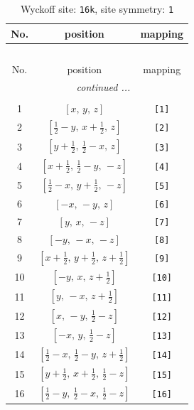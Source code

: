 \documentclass[fleqn,8pt]{jsarticle}
\begin{document}
\begin{longtable}{ccc}
\caption{Wyckoff site: {\tt 16k}, site symmetry: {\tt 1}}
 \\
 \hline \hline
No. & position & mapping \\ \hline \endfirsthead

\multicolumn{2}{l}{\tablename\ \thetable{}} \\
 \hline \hline
No. & position & mapping \\ \hline \endhead

 \hline \hline
\multicolumn{2}{r}{\footnotesize\it continued ...} \\ \endfoot

 \hline \hline
\multicolumn{2}{r}{} \\ \endlastfoot

1 & $\left[ x,\, y,\, z \right]$ & {\tt [1]} \\ \hline
2 & $\left[ \frac{1}{2} - y,\, x + \frac{1}{2},\, z \right]$ & {\tt [2]} \\ \hline
3 & $\left[ y + \frac{1}{2},\, \frac{1}{2} - x,\, z \right]$ & {\tt [3]} \\ \hline
4 & $\left[ x + \frac{1}{2},\, \frac{1}{2} - y,\, - z \right]$ & {\tt [4]} \\ \hline
5 & $\left[ \frac{1}{2} - x,\, y + \frac{1}{2},\, - z \right]$ & {\tt [5]} \\ \hline
6 & $\left[ - x,\, - y,\, z \right]$ & {\tt [6]} \\ \hline
7 & $\left[ y,\, x,\, - z \right]$ & {\tt [7]} \\ \hline
8 & $\left[ - y,\, - x,\, - z \right]$ & {\tt [8]} \\ \hline
9 & $\left[ x + \frac{1}{2},\, y + \frac{1}{2},\, z + \frac{1}{2} \right]$ & {\tt [9]} \\ \hline
10 & $\left[ - y,\, x,\, z + \frac{1}{2} \right]$ & {\tt [10]} \\ \hline
11 & $\left[ y,\, - x,\, z + \frac{1}{2} \right]$ & {\tt [11]} \\ \hline
12 & $\left[ x,\, - y,\, \frac{1}{2} - z \right]$ & {\tt [12]} \\ \hline
13 & $\left[ - x,\, y,\, \frac{1}{2} - z \right]$ & {\tt [13]} \\ \hline
14 & $\left[ \frac{1}{2} - x,\, \frac{1}{2} - y,\, z + \frac{1}{2} \right]$ & {\tt [14]} \\ \hline
15 & $\left[ y + \frac{1}{2},\, x + \frac{1}{2},\, \frac{1}{2} - z \right]$ & {\tt [15]} \\ \hline
16 & $\left[ \frac{1}{2} - y,\, \frac{1}{2} - x,\, \frac{1}{2} - z \right]$ & {\tt [16]} \\
\end{longtable}
\end{document}
